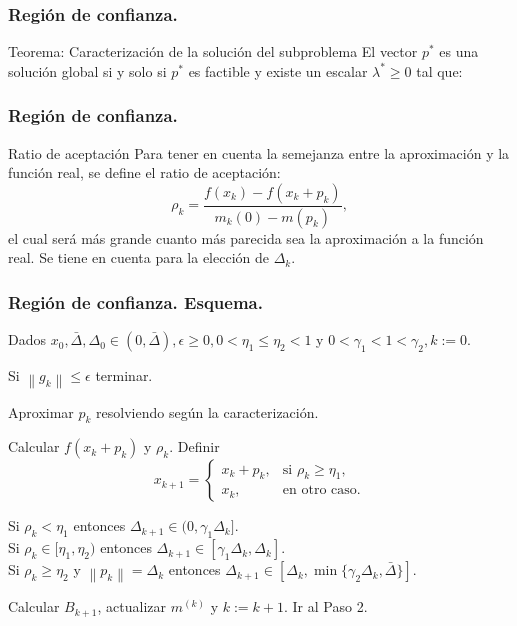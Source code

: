 \documentclass{beamer}
\newcommand{\norm}[1]{\left\lVert#1\right\rVert}
\begin{document}
\begin{frame}
    \frametitle{Región de confianza.}
    \begin{block}{Teorema: Caracterización de la solución del subproblema}
        El vector $p^*$ es una solución global si y solo si $p^*$ es factible y existe un escalar $\lambda^* \geq 0$ tal que:
    \end{block}
\end{frame}

\begin{frame}
    \frametitle{Región de confianza.}
    \begin{block}{Ratio de aceptación}
        Para tener en cuenta la semejanza entre la aproximación y la función real, se define el ratio de aceptación:
        \begin{equation*}
            \rho_k = \frac{f(x_k) - f(x_k + p_k)}{m_k(0) - m(p_k)},
        \end{equation*}
        el cual será más grande cuanto más parecida sea la aproximación a la función real. Se tiene en cuenta para la elección de $\Delta_k$.
    \end{block}
\end{frame}

\begin{frame}
    \frametitle{Región de confianza. Esquema.}
    \begin{steps}
		\item Dados $x_0, \bar{\Delta}, \Delta_0 \in (0, \bar{\Delta}), \epsilon \geq
			0, 0<\eta_1\leq\eta_2<1$ y $0<\gamma_1<1<\gamma_2, k:=0$.
		\item Si $\norm{g_k} \leq \epsilon$ terminar.
		\item Aproximar $p_k$ resolviendo según la caracterización.
		\item Calcular $f(x_k+p_k)$ y $\rho_k$. Definir
			\begin{equation*}
				x_{k+1} = \begin{cases}
					x_k + p_k, & \text{si } \rho_k \geq \eta_1, \\
					x_k, & \text{en otro caso.}
				\end{cases}
			\end{equation*}
		\item Si $\rho_k < \eta_1$ entonces $\Delta_{k+1} \in (0,\gamma_1 \Delta_k]$. \\
			Si $\rho_k \in [\eta_1, \eta_2)$ entonces $\Delta_{k+1} \in [\gamma_1 \Delta_k,\Delta_k]$. \\
			Si $\rho_k \geq \eta_2$ y $\norm{p_k}=\Delta_k$ entonces
			$\Delta_{k+1} \in [\Delta_k, \min \{\gamma_2 \Delta_k,\bar{\Delta}\}]$.
		\item Calcular $B_{k+1}$, actualizar $m^{(k)}$ y $k:=k+1$. Ir al Paso 2.
	\end{steps}
\end{frame}
\end{document}
